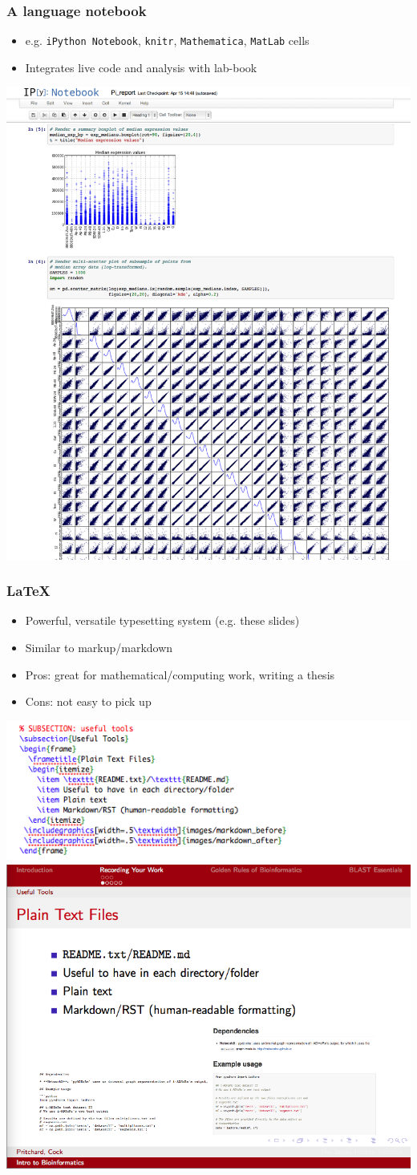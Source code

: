\begin{frame}
  \frametitle{A language notebook}
  \begin{itemize}
    \item e.g. \texttt{iPython Notebook}, \texttt{knitr}, \texttt{Mathematica}, \texttt{MatLab} cells
    \item Integrates live code and analysis with lab-book
  \end{itemize}
  \begin{center}
    \includegraphics[width=.35\textwidth]{images/ipython_notebook}     
  \end{center}
\end{frame}

 \begin{frame}
   \frametitle{\LaTeX}
   \begin{itemize}
     \item Powerful, versatile typesetting system (e.g. these slides)
     \item Similar to markup/markdown
     \item Pros: great for mathematical/computing work, writing a thesis
     \item Cons: not easy to pick up
  \end{itemize}
  \begin{center}
     \includegraphics[width=.35\textwidth]{images/latex_before}
     \includegraphics[width=.35\textwidth]{images/latex_after}     
  \end{center}
\end{frame}
